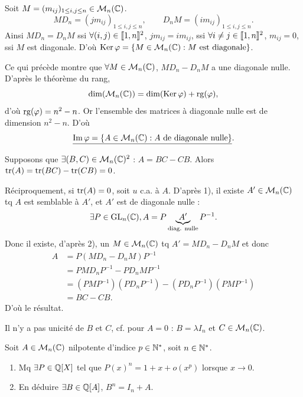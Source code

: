 \begin{solution}
Soit $M=(m_{ij})_{1\leq i,j\leq n}\in\mathcal M_n(\mathbb C)$.
\[
MD_n=(jm_{ij})_{1\leq i,j\leq n},\qquad
D_nM=(im_{ij})_{1\leq i,j\leq n}.
\]
Ainsi $MD_n=D_nM$ ssi $\forall(i,j)\in\llbracket 1,n\rrbracket^2$, $jm_{ij}=im_{ij}$,
ssi $\forall i\neq j\in\llbracket 1,n\rrbracket^2$, $m_{ij}=0$, ssi $M$ est diagonale.
D'où $\operatorname{Ker}\varphi=\{M\in\mathcal M_n(\mathbb C):M\text{ est diagonale}\}$.

Ce qui précède montre que $\forall M\in\mathcal M_n(\mathbb C)$, $MD_n-D_nM$ a une diagonale nulle.
D'après le théorème du rang,
\[
\dim(\mathcal M_n(\mathbb C))=\dim(\operatorname{Ker}\varphi)+\operatorname{rg}(\varphi),
\]
d'où $\operatorname{rg}(\varphi)=n^2-n$. Or l'ensemble des matrices à diagonale nulle est de dimension
$n^2-n$. D'où
\[
\underline{\operatorname{Im}\varphi=\{A\in\mathcal M_n(\mathbb C):A\text{ de diagonale nulle}\}}.
\]

Supposons que $\exists(B,C)\in\mathcal M_n(\mathbb C)^2$ : $A=BC-CB$. Alors
$\operatorname{tr}(A)=\operatorname{tr}(BC)-\operatorname{tr}(CB)=0$.

Réciproquement, si $\operatorname{tr}(A)=0$, soit $u$ c.a. à $A$. D'après 1), il existe
$A'\in\mathcal M_n(\mathbb C)$ tq $A$ est semblable à $A'$, et $A'$ est de diagonale nulle :
\[
\exists P\in\operatorname{GL}_n(\mathbb C), A=P\underbrace{A'}_{\text{diag. nulle}}P^{-1}.
\]
Donc il existe, d'après 2), un $M\in\mathcal M_n(\mathbb C)$ tq $A'=MD_n-D_nM$ et donc
\begin{align*}
A&=P(MD_n-D_nM)P^{-1}\\
&=PMD_nP^{-1}-PD_nMP^{-1}\\
&=(PMP^{-1})(PD_nP^{-1})-(PD_nP^{-1})(PMP^{-1})\\
&=BC-CB.
\end{align*}
D'où le résultat.

\begin{remarkbox}
Il n'y a pas unicité de $B$ et $C$, cf. pour $A=0$ : $B=\lambda I_n$ et
$C\in\mathcal M_n(\mathbb C)$.
\end{remarkbox}
\end{solution}


\begin{statementbox}
Soit $A\in\mathcal M_n(\mathbb C)$ nilpotente d'indice $p\in\mathbb N^*$, soit $n\in\mathbb N^*$.
\begin{enumerate}[label=\alph*.]
  \item Mq $\exists P\in\mathbb Q[X]$ tel que $P(x)^n=1+x+o(x^p)$ lorsque $x\to0$.
  \item En déduire $\exists B\in\mathbb Q[A]$, $B^n=I_n+A$.
\end{enumerate}
\end{statementbox}

